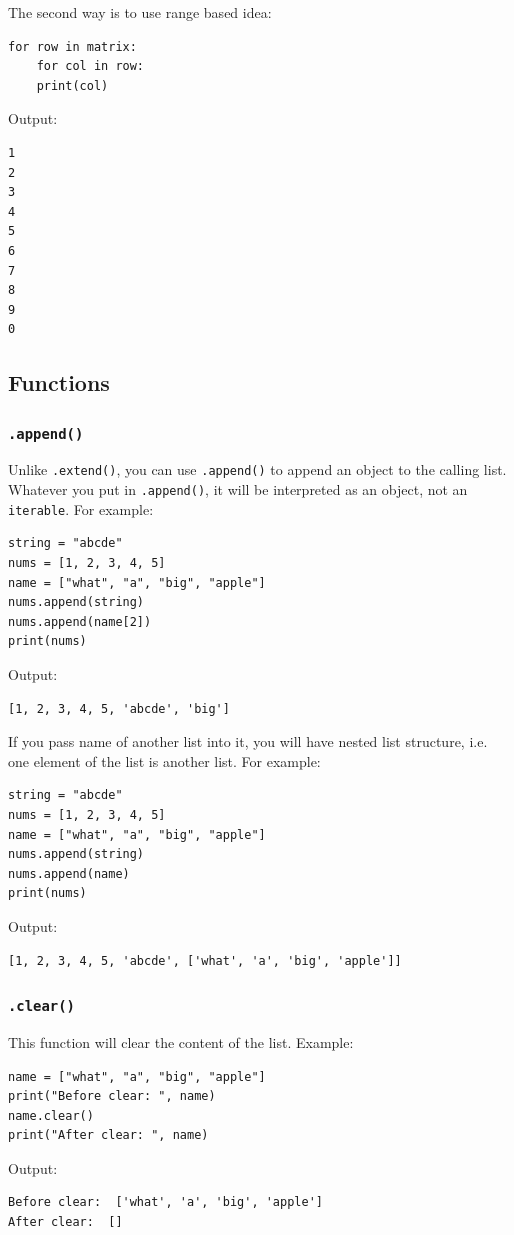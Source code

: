 \documentclass[12pt]{book}
\begin{document}
The second way is to use range based idea:
\begin{verbatim}
for row in matrix:
    for col in row:
	print(col)
\end{verbatim}
Output:
\begin{verbatim}
1
2
3
4
5
6
7
8
9
0
\end{verbatim}

\subsection{Functions}
\label{sec:org204026c}
\subsubsection{\texttt{.append()}}
\label{sec:org7f465e5}
Unlike \texttt{.extend()}, you can use \texttt{.append()} to append an object to the calling list. Whatever you put in \texttt{.append()}, it will be interpreted as an object, not an \texttt{iterable}. For example:
\begin{verbatim}
string = "abcde"
nums = [1, 2, 3, 4, 5]
name = ["what", "a", "big", "apple"]
nums.append(string)
nums.append(name[2])
print(nums)
\end{verbatim}
Output:
\begin{verbatim}
[1, 2, 3, 4, 5, 'abcde', 'big']
\end{verbatim}

If you pass name of another list into it, you will have nested list structure, i.e. one element of the list is another list. For example:
\begin{verbatim}
string = "abcde"
nums = [1, 2, 3, 4, 5]
name = ["what", "a", "big", "apple"]
nums.append(string)
nums.append(name)
print(nums)
\end{verbatim}
Output:
\begin{verbatim}
[1, 2, 3, 4, 5, 'abcde', ['what', 'a', 'big', 'apple']]
\end{verbatim}
\subsubsection{\texttt{.clear()}}
\label{sec:org32064cc}
This function will clear the content of the list. Example:
\begin{verbatim}
name = ["what", "a", "big", "apple"]
print("Before clear: ", name)
name.clear()
print("After clear: ", name)
\end{verbatim}
Output:
\begin{verbatim}
Before clear:  ['what', 'a', 'big', 'apple']
After clear:  []
\end{verbatim}
\end{document}

